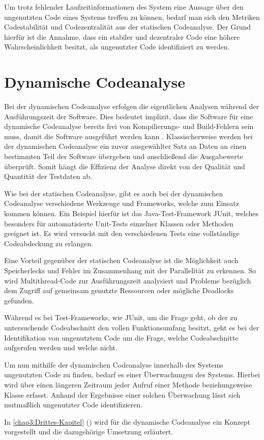 Um trotz fehlender Laufzeitinformationen des System eine Aussage über den ungenutzten Code eines Systems treffen zu können, bedarf man sich den Metriken \glqq Codestabilität\grqq{} und \glqq Codezentralität\grqq{} aus der statischen Codeanalyse. Der Grund hierfür ist die Annahme, dass ein stabiler und dezentraler Code eine höhere Wahrscheinlichkeit besitzt, als ungenutzter Code identifiziert zu werden. \cite{RomanHaas.}

\section{Dynamische Codeanalyse\label{sec2.2:Unterpunkt-2}}

Bei der dynamischen Codeanalyse erfolgen die eigentlichen Analysen während der Ausführungszeit der Software. Dies bedeutet implizit, dass die Software für eine dynamische Codeanalyse bereits frei von Kompilierungs- und Build-Fehlern sein muss, damit die Software ausgeführt werden kann \cite{IlyaGainulin.2019}. Klassischerweise werden bei der dynamischen Codeanalyse ein zuvor ausgewählter Satz an Daten an einen bestimmten Teil der Software übergeben und anschließend die Ausgabewerte überprüft. Somit hängt die Effizienz der Analyse direkt von der Qualität und Quantität der Testdaten ab.

Wie bei der statischen Codeanalyse, gibt es auch bei der dynamischen Codeanalyse verschiedene Werkzeuge und Frameworks, welche zum Einsatz kommen können. Ein Beispiel hierfür ist das Java-Test-Framework \glqq JUnit\grqq{}, welches besonders für automatisierte Unit-Tests einzelner Klassen oder Methoden geeignet ist. Es wird versucht mit den verschiedenen Tests eine vollständige Codeabdeckung zu erlangen.

Eine Vorteil gegenüber der statischen Codeanalyse ist die Möglichkeit auch Speicherlecks und Fehler im Zusammenhang mit der Parallelität zu erkennen. So wird Multithread-Code zur Ausführungszeit analysiert und Probleme bezüglich dem Zugriff auf gemeinsam genutzte Ressourcen oder mögliche Deadlocks gefunden.

Während es bei Test-Frameworks, wie \glqq JUnit\grqq{}, um die Frage geht, ob der zu untersuchende Codeabschnitt den vollen Funktionsumfang besitzt, geht es bei der Identifikation von ungenutztem Code um die Frage, welche Codeabschnitte aufgerufen werden und welche nicht.

Um nun mithilfe der dynamischen Codeanalyse innerhalb des Systems ungenutzten Code zu finden, bedarf es einer Überwachungen des Systems. Hierbei wird über einen längeren Zeitraum jeder Aufruf einer Methode beziehungsweise Klasse erfasst. Anhand der Ergebnisse einer solchen Überwachung lässt sich mutmaßlich ungenutzter Code identifizieren.

In \autoref{chap3:Drittes-Kapitel} () wird für die dynamische Codeanalyse ein Konzept vorgestellt und die dazugehörige Umsetzung erläutert.